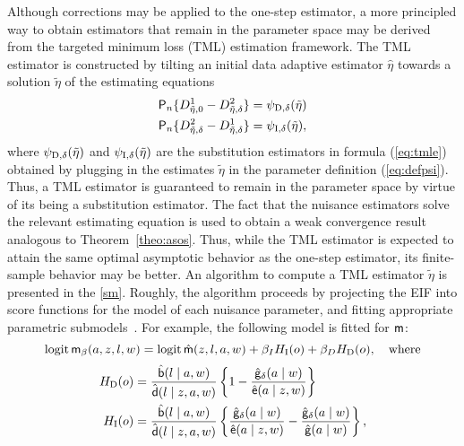 Although corrections may be applied to the one-step estimator, a more principled
way to obtain estimators that remain in the parameter space may be derived from
the targeted minimum loss (TML) estimation framework. The TML estimator is
constructed by tilting an initial data adaptive estimator $\hat{\eta}$ towards
a solution $\tilde{\eta}$ of the estimating equations
\begin{equation}
  \begin{split}
    \mathsf{P}_n \{D_{\tilde\eta,0}^1 - D_{\tilde\eta,\delta}^2\} &=
    \psi_{\mbox{\scriptsize D}, \delta}(\tilde\eta) \\
    \mathsf{P}_n \{D_{\tilde\eta,\delta}^2 - D_{\tilde\eta,\delta}^1\} &=
    \psi_{\mbox{\scriptsize I}, \delta}(\tilde\eta),
  \end{split}\label{eq:eqtmle}
\end{equation}
where $\psi_{\mbox{\scriptsize D}, \delta}(\tilde\eta)$ and $\psi_{\mbox{\scriptsize I}, \delta}(\tilde\eta)$ are the substitution
estimators in formula (\ref{eq:tmle}) obtained by plugging in the estimates
$\tilde{\eta}$ in the parameter definition (\ref{eq:defpsi}). Thus, a TML
estimator is guaranteed to remain in the parameter space by virtue of its being
a substitution estimator. The fact that the nuisance estimators solve the
relevant estimating equation is used to obtain a weak convergence result
analogous to Theorem~\ref{theo:asos}. Thus, while the TML estimator is expected
to attain the same optimal asymptotic behavior as the one-step estimator, its
finite-sample behavior may be better. An algorithm to compute a TML estimator
$\tilde\eta$ is presented in the \ref{sm}. Roughly, the algorithm proceeds by
projecting the EIF into score functions for the model of each nuisance
parameter, and fitting appropriate parametric
submodels~\citep{vdl2011targeted, vdl2018targeted}. For example, the following
model is fitted for $\mathsf{m}$:
$$\operatorname{logit} \mathsf{m}_\beta(a,z,l,w) = \operatorname{logit} \hat
  {\mathsf{m}}(z,l,a,w) + \beta_I H_{\mbox{\scriptsize I}}(o) +
  \beta_D H_{\mbox{\scriptsize D}}(o), \quad \text{where}$$
\begin{align*}
  H_{\mbox{\scriptsize D}}(o) &= \frac{{\hat{\mathsf{b}}}(l\mid a,
                                w)}{{\hat{\mathsf{d}}}(l \mid z, a,
                                w)}\left\{1-\frac{{\hat{\mathsf{g}}}_\delta(a\mid
                                w)}{{\hat{\mathsf{e}}}(a\mid z,w)}\right\}\\
  H_{\mbox{\scriptsize I}}(o) &= \frac{{\hat{\mathsf{b}}}(l\mid a,
                                w)}{{\hat{\mathsf{d}}}(l \mid z, a,
                                w)}\left\{\frac{{\hat{\mathsf{g}}}_\delta(a\mid
                                w)}{{\hat{\mathsf{e}}}(a\mid
                                z,w)}-\frac{\hat{\mathsf{g}}_\delta(a
                                \mid w)}{{\hat{\mathsf{g}}}(a\mid w)}\right\},
\end{align*}
